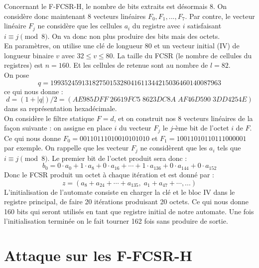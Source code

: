 \documentclass[11pt]{report}
\begin{document}
Concernant le F-FCSR-H, le nombre de bits extraits est désormais 8. On considère donc maintenant 8 vecteurs linéaires $F_0,F_1,...,F_7$. Par contre, le vecteur linéaire $F_j$ ne considère que les cellules $a_i$ du registre avec $i$ satisfaisant $i \equiv j \pmod 8$. On va donc non plus produire des bits mais des octets. \\
En paramètres, on utilise une clé de longueur 80 et un vecteur initial (IV) de longueur binaire $v$ avec $32 \leq v \leq 80$. La taille du FCSR (le nombre de cellules du registres) est $n=160$. Et les cellules de retenue sont au nombre de $l = 82$.
\\
On pose
$$
q=1993524591318275015328041611344215036460140087963$$
ce qui nous donne : 
$$
d=(1+|q|)/2 = (AE985DFF\; 26619FC5\; 8623DC8A\; AF46D590\; 3DD4254E)$$
dans sa représentation hexadécimale. 
\\
On considère le filtre statique $F=d$, et on construit nos 8 vecteurs linéaires de la façon suivante : on assigne en place $i$ du vecteur $F_j$ le $j$-ème bit de l'octet $i$ de $F$.
\\
Ce qui nous donne $F_0 = 00110111010010101010$ et $F_1= 10011010110111000001$ par exemple. 
On rappelle que les vecteur $F_j$ ne considèrent que les $a_i$ tels que $i \equiv j \pmod 8$. Le premier bit de l'octet produit sera donc : 
$$
b_0 = 0 \cdot a_0 + 1 \cdot a_8 + 0 \cdot a_{16} + \cdots + 1 \cdot a_{136} + 0 \cdot a_{144} + 0 \cdot a_{152}
$$
Donc le FCSR produit un octet à chaque itération et est donné par :
$$
z= (a_8+a_{24}+\cdots + a_{135},\; a_1 + a_{47} + \cdots, ...)
$$
L'initialisation de l'automate consiste en charger la clé et le bloc IV dans le registre principal, de faire 20 itérations produisant 20 octets. Ce qui nous donne 160 bits qui seront utilisés en tant que registre initial de notre automate. Une fois l'initialisation terminée on le fait tourner 162 fois sans produire de sortie. 

\section{Attaque sur les F-FCSR-H}
\end{document}
